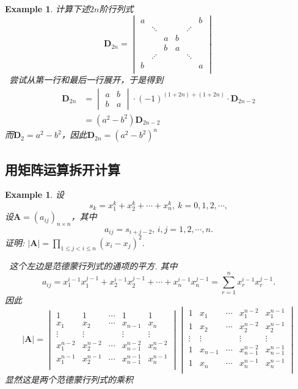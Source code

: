 \documentclass{article}
\newtheorem{example}[theorem]{Example}
\newcommand{\hints}{{\color{blue} \text{hints}}}
\newcommand{\mbf}[1]{\bm{#1}}
\begin{document}
\begin{example}
\rm 计算下述$2n$阶行列式
$$
\mbf{D}_{2n} = \begin{vmatrix}
a  & & & &  & b \\
   & \ddots & & & \iddots \\
  & & a & b &  &  \\
  & & b & a &  & \\
  &  \iddots & & &  \ddots \\
  b& & & &  &a\\
\end{vmatrix}
$$
\hints\ 尝试从第一行和最后一行展开，于是得到
$$
\begin{array}{ll}
\mbf{D}_{2n} &= \begin{vmatrix}
a & b \\
b & a 
\end{vmatrix}\cdot (-1)^{(1+2n)+(1+2n)}\cdot \mbf{D}_{2n-2} \\
&=(a^2-b^2)\mbf{D}_{2n-2}
\end{array} 
$$
而$\mbf{D}_2=a^2 - b^2$，因此$\mbf{D}_{2n} = (a^2-b^2)^{n}$ 
\end{example}


\subsection{用矩阵运算拆开计算}

\begin{example}
\rm 设
$$
s_k = x_1^k +x_2^k + \cdots + x_n^k, ~ k = 0,1,2,\cdots, 
$$
设$\mbf{A} = (a_{ij})_{n \times n}$，其中
$$
a_{ij} = s_{i+j-2}, \, i,j = 1,2,\cdots,n.
$$
证明: $|\mbf{A}| = \prod\limits_{1 \leq j < i \leq n}(x_i - x_j)^2$. 

\hints\ 这个左边是范德蒙行列式的通项的平方. 其中
$$
a_{ij} = x_1^{i-1}x_1^{j-1} + x_2^{i-1}x_2^{j-1} + \cdots + x_n^{i-1}x_n^{j-1} = \sum\limits_{r=1}^n x_r^{i-1}x_r^{j-1}. 
$$
因此
$$
|\mbf{A}| = \begin{vmatrix}
1 & 1  & \cdots & 1 & 1 \\
x_1 & x_2 & \cdots & x_{n-1} & x_n \\
\vdots & \vdots &  & \vdots & \vdots \\
x_1^{n-2} & x_2^{n-2} & \cdots & x_{n-1}^{n-2} & x_n^{n-2} \\
x_1^{n-1} & x_2^{n-1} & \cdots & x_{n-1}^{n-1} & x_n^{n-1} \\
\end{vmatrix}
\begin{vmatrix}
1 & x_1  & \cdots & x_1^{n-2} & x_1^{n-1} \\
1 & x_2 & \cdots & x_2^{n-2} & x_2^{n-1} \\
\vdots & \vdots &  & \vdots & \vdots \\
1 & x_{n-1} & \cdots & x_{n-1}^{n-2} & x_{n-1}^{n-1} \\
1 & x_{n} & \cdots & x_{n}^{n-1} & x_n^{n-1} \\
\end{vmatrix}  
$$
显然这是两个范德蒙行列式的乘积
\end{example}
\end{document}
